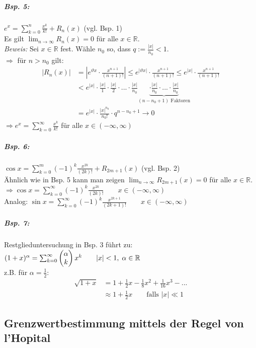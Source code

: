 \subparagraph{Bsp. 5:} $e^x=\sum_{k=0}^n \frac{x^k}{k!}+R_n(x)$ (vgl. Bsp. 1)\\
Es gilt $\lim_{n\to \infty}R_n(x) = 0$ für alle $x\in \mathbb{R}$.\\
\emph{Beweis:} Sei $x\in \mathbb{R}$ fest. Wähle $n_0$ so, dass $q:= \frac{|x|}{n_0}<1$.\\
$\Rightarrow$ für $n> n_0$ gilt:
\begin{align*}
|R_n(x)| &= \left| e^{\vartheta x} \cdot \frac{x^{n+1}}{(n+1)!}\right| \leq e^{|\vartheta x|} \cdot \frac{x^{n+1}}{(n+1)!}\leq e^{|x|} \cdot \frac{x^{n+1}}{(n+1)!}\\
&<e^{|x|}\cdot \frac{|x|}{1}\cdot \frac{|x|}{2}\cdot ... \cdot \frac{|x|}{n_0} \underbrace{\cdot \frac{|x|}{n_0} \cdot...\cdot \frac{|x|}{n_0}}_{(n-n_0+1)\text{ Faktoren}}\\
&= e^{|x|}\cdot \frac{|x|^{n_0}}{n_0!}\cdot q^{n-n_0+1} \to 0 
\end{align*}
$\Rightarrow e^x=\sum_{k=0}^\infty \frac{x^k}{k!}$ für alle $x \in (-\infty, \infty)$
\subparagraph{Bsp. 6:} $\cos x = \sum_{k=0}^m (-1)^k \frac{x^{2k}}{(2k)!}+R_{2m+1}(x)$ (vgl. Bsp. 2)\\
Ähnlich wie in Bsp. 5 kann man zeigen $\lim_{n\to \infty}R_{2m+1}(x)=0$ für alle $x\in \mathbb{R}$.\\
$\Rightarrow \cos x = \sum_{k=0}^\infty (-1)^k \frac{x^{2k}}{(2k)!} \qquad x \in (-\infty, \infty)$\\
Analog: $\sin x = \sum_{k=0}^\infty (-1)^k \frac{x^{2k+1}}{(2k+1)!} \qquad x \in (-\infty, \infty)$

\subparagraph{Bsp. 7:} Restglieduntersuchung in Bsp. 3 führt zu:\\
$(1+x)^\alpha = \sum_{k=0}^\infty \begin{pmatrix}\alpha\\k\end{pmatrix}x^k \qquad |x|<1, \; \alpha \in \mathbb{R}$\\
z.B. für $\alpha = \frac{1}{2}$: 
\begin{align*}
\sqrt{1+x}&=1+\frac{1}{2}x-\frac{1}{8}x^2+\frac{1}{16}x^3-... \\
&\approx 1+\frac{1}{2}x \qquad \text{falls }|x|\ll 1
\end{align*}

\subsection{Grenzwertbestimmung mittels der Regel von l'Hopital}
